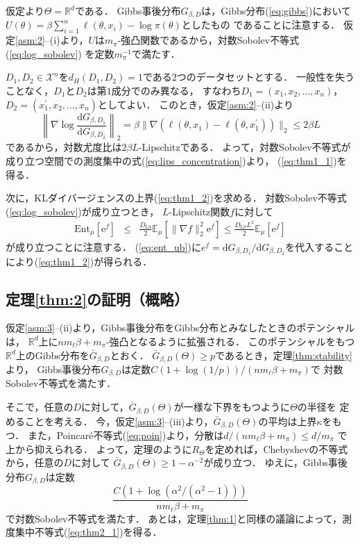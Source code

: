 \documentclass{jarticle}
\newcommand{\dd}{\mathrm{d}}
\newcommand{\ee}{\mathrm{e}}
\theoremstyle{definition}
\begin{document}
仮定より$\Theta = \mathbb{R}^d$である．
Gibbs事後分布$G_{\beta, D}$は，Gibbs分布(\ref{eq:gibbs})において
$U(\theta) = \beta \sum_{i=1}^{n} \ell(\theta, x_i) -\log \pi (\theta)$としたもの
であることに注意する．
仮定\ref{asm:2}--(i)より，$U$は$m_\pi$-強凸関数であるから，対数Sobolev不等式(\ref{eq:log_sobolev})
を定数$m_\pi ^{-1}$で満たす．

$D_1, D_2 \in \mathcal{X}^n$を$d_H(D_1, D_2)=1$である$2$つのデータセットとする．
一般性を失うことなく，$D_1$と$D_2$は第$1$成分でのみ異なる，
すなわち$D_1=(x_1, x_2, \ldots, x_n)$，$D_2=(x_1^\prime, x_2, \ldots, x_n)$としてよい．
このとき，仮定\ref{asm:2}--(ii)より
\begin{equation}
\left \lVert \nabla \log \frac{\dd G_{\beta, D_1}}{\dd G_{\beta, D_2}} \right \rVert_{2}
= \beta \parallel \nabla (\ell(\theta, x_1) - \ell(\theta, x_1^\prime)) \parallel_2 \leq 2\beta L
\end{equation}
であるから，対数尤度比は$2\beta L$-Lipschitzである．
よって，対数Sobolev不等式が成り立つ空間での測度集中の式(\ref{eq:lips_concentration})より，
(\ref{eq:thm1_1})を得る．

次に，KLダイバージェンスの上界(\ref{eq:thm1_2})を求める．
対数Sobolev不等式(\ref{eq:log_sobolev})が成り立つとき，
$L$-Lipschitz関数$f$に対して
\begin{align}
\mathrm{Ent}_{\mu}[\ee^{f}] &\leq& \frac{D_\mathrm{LS}}{2} \mathbb{E}_{\mu}\left[\lVert  \nabla f  \rVert_{2}^{2} \ee^f \right]
\leq \frac{D_\mathrm{LS}L^2}{2}\mathbb{E}_{\mu} [\ee ^f ]
\label{eq:ent_ub}
\end{align}
が成り立つことに注意する．
(\ref{eq:ent_ub})に$e^f = \dd G_{\beta, D_1} / \dd G_{\beta, D_2}$を代入することにより(\ref{eq:thm1_2})が得られる．

\subsection{定理\ref{thm:2}の証明（概略）}

仮定\ref{asm:3}--(ii)より，Gibbs事後分布をGibbs分布とみなしたときのポテンシャルは，
$\mathbb{R}^d$上に$n m_\ell \beta + m_\pi$-強凸となるように拡張される．
このポテンシャルをもつ$\mathbb{R}^d$上のGibbs分布を$\bar{G}_{\beta, D}$とおく．
$\bar{G}_{\beta, D}(\Theta) \geq p$であるとき，定理\ref{thm:stability}より，
Gibbs事後分布$G_{\beta, D}$は定数$C(1 + \log(1/p))/(n m_\ell \beta + m_\pi)$で
対数Sobolev不等式を満たす．

そこで，任意の$D$に対して，$\bar{G}_{\beta, D}(\Theta)$が一様な下界をもつように$\Theta$の半径を
定めることを考える．
今，仮定\ref{asm:3}--(iii)より，$\bar{G}_{\beta, D}(\Theta)$の平均は上界$\kappa$をもつ．
また，Poincar\'{e}不等式(\ref{eq:poin})より，分散は$d/(nm_\ell \beta + m_\pi) \leq d/m_\pi$
で上から抑えられる．
よって，定理のように$R_\Theta$を定めれば，Chebyshevの不等式から，任意の$D$に対して
$\bar{G}_{\beta, D}(\Theta) \geq　1 - \alpha^{-2}$が成り立つ．
ゆえに，Gibbs事後分布$G_{\beta, D}$は定数
\begin{equation}
\frac{C(1 + \log(\alpha^2/(\alpha^2-1)))}{n m_\ell \beta + m_\pi}
\end{equation}
で対数Sobolev不等式を満たす．
あとは，定理\ref{thm:1}と同様の議論によって，測度集中不等式(\ref{eq:thm2_1})を得る．
\end{document}
